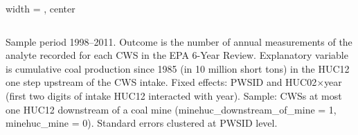 \begin{table}[htbp]
\begin{adjustbox}{width = \textwidth, center}
\begin{tabular}{lcccccccccccccccccc}
         \bottomrule
         
      \end{tabular}
      
      
      
   \end{adjustbox}
      {\tiny\linespread{1}\selectfont \par \raggedright 
   Sample period 1998--2011. Outcome is the number of annual measurements of the analyte recorded for each CWS in the EPA 6-Year Review. Explanatory variable is cumulative coal production since 1985 (in 10 million short tons) in the HUC12 one step upstream of the CWS intake. Fixed effects: PWSID and HUC02$\times$year (first two digits of intake HUC12 interacted with year). Sample: CWSs at most one HUC12 downstream of a coal mine (minehuc\_downstream\_of\_mine = 1, minehuc\_mine = 0). Standard errors clustered at PWSID level.}
   
\end{table}


